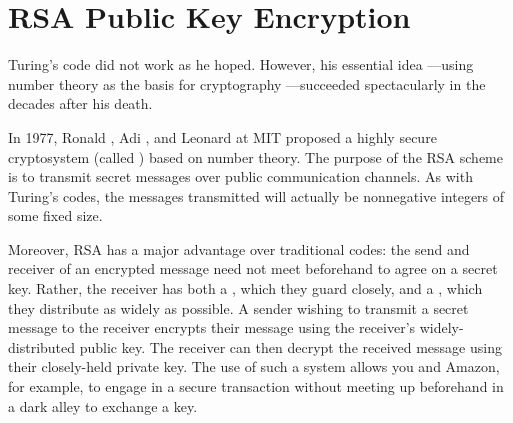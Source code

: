 \begin{problems}
\practiceproblems
{}

\classproblems
{}

\homeworkproblems
{}

\examproblems
{}

\end{problems}

\section{RSA Public Key Encryption}\label{RSA_sec}

Turing's code did not work as he hoped.  However, his essential idea
---using number theory as the basis for cryptography ---succeeded
spectacularly in the decades after his death.

In 1977, Ronald , Adi , and Leonard
 at MIT proposed a highly secure cryptosystem (called
\textbf{}) based on number theory.  The purpose of the RSA
scheme is to transmit secret messages over public communication
channels.  As with Turing's codes, the messages transmitted will
actually be nonnegative integers of some fixed size.

Moreover, RSA has a major advantage over traditional codes:
the send and receiver of an encrypted message need not meet beforehand
to agree on a secret key.  Rather, the receiver has both a
, which they guard closely, and a ,
which they distribute as widely as possible.  A sender wishing to
transmit a secret message to the receiver encrypts their message using
the receiver's widely-distributed public key.  The receiver can then
decrypt the received message using their closely-held private key.
The use of such a  system allows you and
Amazon, for example, to engage in a secure transaction without meeting
up beforehand in a dark alley to exchange a key.

